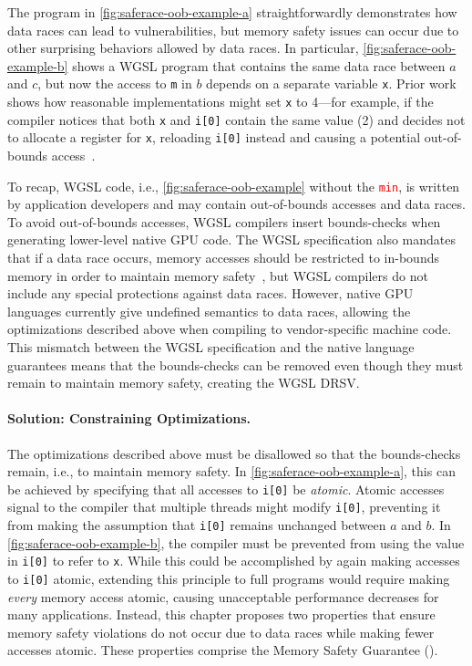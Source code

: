 The program in \myfig\ref{fig:saferace-oob-example-a} straightforwardly demonstrates how data races can lead to vulnerabilities, but memory safety issues can occur due to other surprising behaviors allowed by data races. In particular, \myfig\ref{fig:saferace-oob-example-b} shows a WGSL program that contains the same data race between $a$ and $c$, but now the access to \texttt{m} in $b$ depends on a separate variable \texttt{x}. Prior work shows how reasonable implementations might set \texttt{x} to 4---for example, if the compiler notices that both \texttt{x} and \texttt{i[0]} contain the same value (2) and decides not to allocate a register for \texttt{x}, reloading \texttt{i[0]} instead and causing a potential out-of-bounds access~\cite{dolan2018bounding}.

To recap, WGSL code, i.e., \myfig\ref{fig:saferace-oob-example} without the \textcolor{red}{\texttt{min}}, is written by application developers and may contain out-of-bounds accesses and data races. To avoid out-of-bounds accesses, WGSL compilers insert bounds-checks when generating lower-level native GPU code. The WGSL specification also mandates that if a data race occurs, memory accesses should be restricted to in-bounds memory in order to maintain memory safety~\cite[]{wgslspec}, but WGSL compilers do not include any special protections against data races. However, native GPU languages currently give undefined semantics to data races, allowing the optimizations described above when compiling to vendor-specific machine code. This mismatch between the WGSL specification and the native language guarantees means that the bounds-checks can be removed even though they must remain to maintain memory safety, creating the WGSL DRSV.

\paragraph{Solution: Constraining Optimizations.}

The optimizations described above must be disallowed so that the bounds-checks remain, i.e., to maintain memory safety. In \myfig\ref{fig:saferace-oob-example-a}, this can be achieved by specifying that all accesses to \texttt{i[0]} be \textit{atomic}. Atomic accesses signal to the compiler that multiple threads might modify \texttt{i[0]}, preventing it from making the assumption that \texttt{i[0]} remains unchanged between $a$ and $b$. In \myfig\ref{fig:saferace-oob-example-b}, the compiler must be prevented from using the value in \texttt{i[0]} to refer to \texttt{x}. While this could be accomplished by again making accesses to \texttt{i[0]} atomic, extending this principle to full programs would require making \textit{every} memory access atomic, causing unacceptable performance decreases for many applications. Instead, this chapter proposes two properties that ensure memory safety violations do not occur due to data races while making fewer accesses atomic. These properties comprise the \saferace Memory Safety Guarantee (\smsg).

